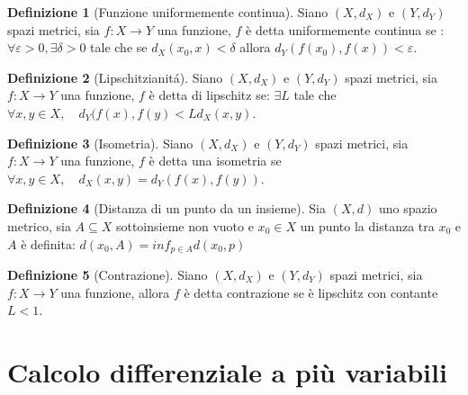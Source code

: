 \documentclass[leqno]{article}
\theoremstyle{definition}
\newtheorem{definition}{Definizione}[section]
\numberwithin{equation}{section}
\theoremstyle{remark}
\begin{document}
	\begin{definition}[Funzione uniformemente continua]
		Siano $(X,d_X)$ e $(Y,d_Y)$ spazi metrici, sia $f:X\rightarrow Y$ una funzione, $f$ è detta uniformemente continua se : $\forall \varepsilon > 0, \exists \delta > 0 $ tale che se $d_X(x_0,x) < \delta$ allora $d_Y(f(x_0),f(x)) < \varepsilon$.
	\end{definition}
	\begin{definition}[Lipschitzianitá]
		Siano $(X,d_X)$ e $(Y,d_Y)$ spazi metrici, sia $f:X\rightarrow Y$ una funzione, $f$ è detta di lipschitz se: $\exists L$ tale che $\forall x,y \in X, \quad d_Y(f(x),f(y)<Ld_X(x,y)$.
	\end{definition}
	\begin{definition}[Isometria]
		Siano $(X,d_X)$ e $(Y,d_Y)$ spazi metrici, sia $f:X\rightarrow Y$ una funzione, $f$ è detta una isometria se $\forall x,y \in X, \quad d_X(x,y)=d_Y(f(x),f(y))$. 
	\end{definition}
	\begin{definition}[Distanza di un punto da un insieme]
		Sia $(X,d)$ uno spazio metrico, sia $A\subseteq X$ sottoinsieme non vuoto e $x_0 \in X$ un punto la distanza tra $x_0$ e $A$ è definita: $d(x_0,A)=inf_{p\in A}d(x_0,p)$
	\end{definition}
	\begin{definition}[Contrazione]
		Siano $(X,d_X)$ e $(Y,d_Y)$ spazi metrici, sia $f:X\rightarrow Y$ una funzione, allora $f$ è detta contrazione se è lipschitz con contante $L<1$.
	\end{definition}
	
	\section{Calcolo differenziale a più variabili}
	
\end{document}
